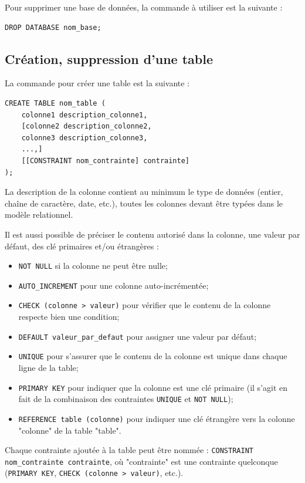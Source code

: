 \documentclass[11pt]{article}
\begin{document}
			Pour supprimer une base de données, la commande à utiliser est la suivante :
			\begin{lstlisting}
DROP DATABASE nom_base;
				\end{lstlisting}
				
				
				
			\subsection{Création, suppression d'une table}
				La commande pour créer une table est la suivante :
				\begin{lstlisting}
CREATE TABLE nom_table (
	colonne1 description_colonne1,
	[colonne2 description_colonne2,
	colonne3 description_colonne3,
	...,]
	[[CONSTRAINT nom_contrainte] contrainte]
);
				\end{lstlisting}
			
				La description de la colonne contient au minimum le type de données (entier, chaîne de caractère, date, etc.), toutes les colonnes devant être typées dans le modèle relationnel.
				
				Il est aussi possible de préciser le contenu autorisé dans la colonne, une valeur par défaut, des clé primaires et/ou étrangères :
				\begin{itemize}
					\item \lstinline{NOT NULL} si la colonne ne peut être nulle;
					\item \lstinline{AUTO_INCREMENT} pour une colonne auto-incrémentée;
					\item \lstinline{CHECK (colonne > valeur)} pour vérifier que le contenu de la colonne respecte bien une condition;
					\item \lstinline{DEFAULT valeur_par_defaut} pour assigner une valeur par défaut;
					\item \lstinline{UNIQUE} pour s'assurer que le contenu de la colonne est unique dans chaque ligne de la table;
					\item \lstinline{PRIMARY KEY} pour indiquer que la colonne est une clé primaire (il s'agit en fait de la combinaison des contraintes \lstinline{UNIQUE} et \lstinline{NOT NULL});
					\item \lstinline{REFERENCE table (colonne)} pour indiquer une clé étrangère vers la colonne "colonne" de la table "table".
				\end{itemize}
				
				Chaque contrainte ajoutée à la table peut être nommée : \lstinline{CONSTRAINT nom_contrainte contrainte}, où "contrainte" est une contrainte quelconque (\lstinline{PRIMARY KEY}, \lstinline{CHECK (colonne > valeur)}, etc.).
				
\end{document}
